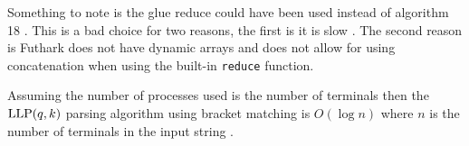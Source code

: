 Something to note is the glue \cite[7]{Vagner2007} reduce could have been used instead of algorithm 18 \cite[18]{Vagner2007}. This is a bad choice for two reasons, the first is it is slow \cite[17]{Vagner2007}. The second reason is Futhark does not have dynamic arrays and does not allow for using concatenation when using the built-in \lstinline|reduce| function.

Assuming the number of processes used is the number of terminals then the $\text{LLP}(q, k)$ parsing algorithm using bracket matching is $O(\log n)$ where $n$ is the number of terminals in the input string \cite[19]{Vagner2007}.
